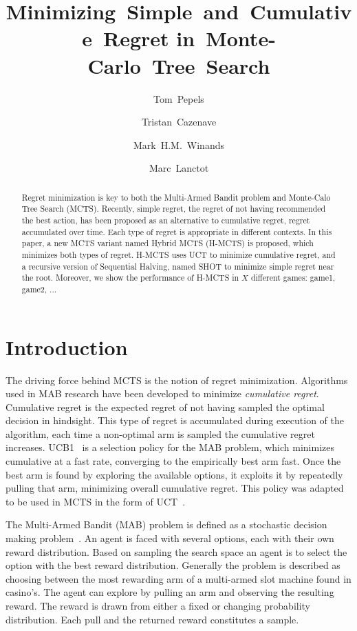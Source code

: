 \documentclass[a4paper]{llncs}
\title{Minimizing~Simple~and~Cumulative~Regret in~Monte-Carlo~Tree~Search}
\author{Tom~Pepels\inst{1} \and Tristan~Cazenave\inst{2} \and
Mark~H.M.~Winands\inst{1} \and Marc~Lanctot\inst{1}}
\institute{Department of Knowledge Engineering,  Maastricht University\\ \email{\{tom.pepels,m.winands,marc.lanctot\}@maastrichtuniversity.nl} \and LAMSADE - Université Paris-Dauphine \\ \email{cazenave@lamsade.dauphine.fr}}
\begin{document}
\maketitle

\begin{abstract} Regret minimization is key to both the Multi-Armed Bandit problem and Monte-Calo Tree Search (MCTS). Recently, simple regret, the regret of not having recommended the best action, has been proposed as an alternative to cumulative regret, regret accumulated over time. Each type of regret is appropriate in different contexts. In this paper, a new MCTS variant named Hybrid MCTS (H-MCTS) is proposed, which minimizes both types of regret. H-MCTS uses UCT to minimize cumulative regret, and a recursive version of Sequential Halving, named SHOT to minimize simple regret near the root. Moreover, we show the performance of H-MCTS in $X$ different games: game1, game2, ...

\end{abstract}

\section{Introduction}
\label{sec:intro}

The driving force behind MCTS is the notion of regret minimization. Algorithms used in MAB research have been developed to minimize \emph{cumulative regret}. Cumulative regret is the expected regret of not having sampled the optimal decision in hindsight. This type of regret is accumulated during execution of the algorithm, each time a non-optimal arm is sampled the cumulative regret increases. UCB1~\cite{auer2002using} is a selection policy for the MAB problem, which minimizes cumulative at a fast rate, converging to the empirically best arm fast. Once the best arm is found by exploring the available options, it exploits it by repeatedly pulling that arm, minimizing overall cumulative regret. This policy was adapted to be used in MCTS in the form of UCT~\cite{kocsis2006bandit}.

The Multi-Armed Bandit (MAB) problem is defined as a stochastic decision making problem~\cite{auer2002using}. An agent is faced with several options, each with their own reward distribution. Based on sampling the search space an agent is to select the option with the best reward distribution. Generally the problem is described as choosing between the most rewarding arm of a multi-armed slot machine found in casino's. The agent can explore by pulling an arm and observing the resulting reward. The reward is drawn from either a fixed or changing probability distribution. Each pull and the returned reward constitutes a sample.
\end{document}
